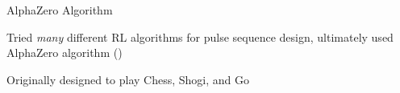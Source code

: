 \documentclass{beamer}
\begin{document}
\begin{frame}{AlphaZero Algorithm}

Tried \emph{many} different RL algorithms for pulse sequence design, ultimately used AlphaZero algorithm (\cite{Silver1140})

Originally designed to play Chess, Shogi, and Go



\begin{figure}
\centering
\scalebox{.7}{

}
\end{figure}


\end{frame}
\end{document}
